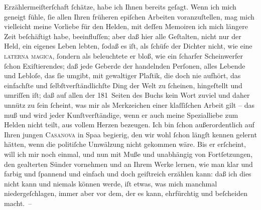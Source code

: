 \begin{ledgroupsized}[t]{13cm}
               Erzählermeiſterſchaft ſchätze, habe ich Ihnen bereits geſagt. Wenn ich mich geneigt
               fühle, ſie allen Ihren früheren epiſchen Arbeiten voranzuſtellen, mag mich vielleicht
               meine Vorliebe für den Helden, mit deſſen Memoiren ich mich längere Zeit beſchäftigt
               habe, beeinfluſſen; aber daß hier alle Geſtalten, nicht nur der Held, ein eigenes
               Leben lebten, ſodaß es iſt, als ſchüfe der Dichter nicht, wie eine \textsc{laterna magica}, ſondern als beleuchtete er bloß, wie ein
               ſcharfer Scheinwerfer ſchon Exiſtierendes; daß jede Geberde der handelnden Perſonen,
               alles {\pb}Lebende und Lebloſe, das ſie
               umgibt, mit gewaltiger Plaſtik, die doch nie aufhört, das einfachſte und
               ſelbſtverſtändlichſte Ding der Welt zu ſcheinen, hingeſtellt und umriſſen iſt; daß
               auf allen der 181 Seiten des Buchs kein Wort zuviel und daher unnütz zu ſein ſcheint, was mir als
               Merkzeichen einer klaſſiſchen Arbeit gilt – das muß und wird jeder Kunſtverſtändige,
               wenn er auch meine Spezialliebe zum Helden nicht teilt, aus vollem Herzen bezeugen.
               Ich bin ſchon außerordentlich auf Ihren jungen \textsc{Casanova} in Spaa begierig, den wir wohl ſchon längſt kennen gelernt hätten, wenn die politiſche
               Umwälzung nicht gekommen wäre. Bis er erſcheint, will ich mir noch einmal, und nun
               mit Muße und unabhängig von Fortſetzungen, den gealterten Sünder vornehmen und an
               Ihrem Werke lernen, wie man klar und farbig und ſpannend und einfach und doch
               geiſtreich erzählen kann: daß ich dies nicht kann und niemals können werde, iſt
               etwas, was mich manchmal niedergeſchlagen, immer aber vor dem, der es kann,
               ehrfürchtig und beſcheiden {\pb}macht. –\pend

\end{ledgroupsized}
